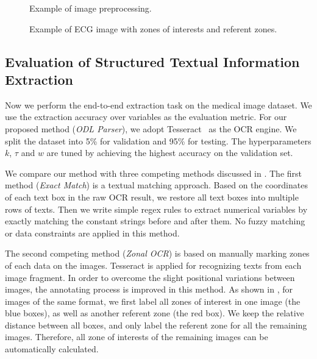 \begin{figure*}[ht]
\centering
{}
{}
\caption{Example of image preprocessing.}
\label{fig:preprocess}
\end{figure*}



\begin{figure*}[ht]
\centering
{}
\caption{Example of ECG image with zones of interests and referent zones.}
\label{fig:zOCR}
\end{figure*}

\subsection{Evaluation of Structured Textual Information Extraction}
Now we perform the end-to-end extraction task on
the medical image dataset.
We use the extraction accuracy over variables as the evaluation metric.
For our proposed method (\textit{ODL Parser}),
we adopt Tesseract~\cite{smith2007overview} as the OCR engine.
We split the dataset into 5\% for validation and 95\% for testing.
The hyperparameters $k$, $\tau$ and $w$ are tuned by achieving the
highest accuracy on the validation set.


We compare our method with three competing methods discussed in .
The first method (\textit{Exact Match}) is a textual matching approach.
Based on the coordinates of each text box in the raw OCR result,
we restore all text boxes into multiple rows of texts.
Then we write simple regex rules to extract numerical variables
by exactly matching the constant strings before and after them.
No fuzzy matching or data constraints are applied in this method.

The second competing method (\textit{Zonal OCR}) is based on
manually marking zones of each data on the images.
Tesseract is applied for recognizing texts from each image fragment.
In order to overcome the slight positional variations between images,
the annotating process is improved in this method.
As shown in , for images of the same format,
we first label all zones of interest in one image (the blue boxes),
as well as another referent zone (the red box).
We keep the relative distance between all boxes,
and only label the referent zone for all the remaining images.
Therefore, all zone of interests of the remaining images
can be automatically calculated.

